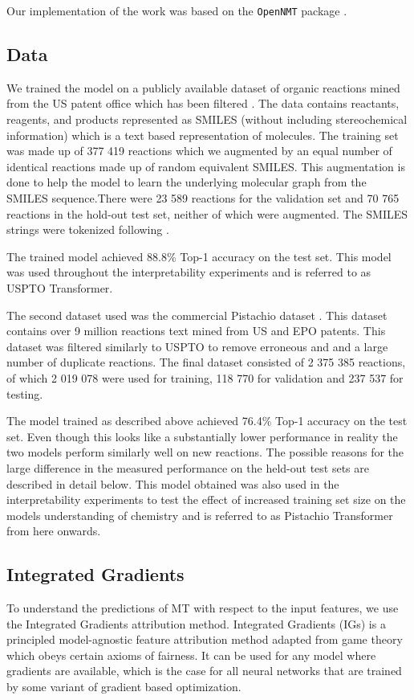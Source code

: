 Our implementation of the work was based on the \texttt{OpenNMT} package \cite{Klein2017}.

\subsection{Data}
We trained the model on a publicly available dataset of organic reactions mined from the US patent office \cite{Lowe2012} which has been filtered \cite{Jin2017}. The data contains reactants, reagents, and products represented as SMILES (without including stereochemical information) which is a text based representation of molecules\cite{Weininger1988, Weininger1989}. The training set was made up of 377 419 reactions which we augmented by an equal number of identical reactions made up of random equivalent SMILES. This augmentation is done to help the model to learn the underlying molecular graph from the SMILES sequence.There were 23 589 reactions for the validation set and 70 765 reactions in the hold-out test set, neither of which were augmented. The SMILES strings were tokenized following \cite{Schwaller2019MolecularPrediction}.

The trained model achieved 88.8\% Top-1 accuracy on the test set. This model was used throughout the interpretability experiments and is referred to as USPTO Transformer.

The second dataset used was the commercial Pistachio dataset \cite{Mayfield2018Pistachio2.0}. This dataset contains over 9 million reactions text mined from US and EPO patents. This dataset was filtered similarly to USPTO to remove erroneous and and a large number of duplicate reactions. The final dataset consisted of 2 375 385 reactions, of which 2 019 078 were used for training, 118 770 for validation and 237 537 for testing. 

The model trained as described above achieved 76.4\% Top-1 accuracy on the test set. Even though this looks like a substantially lower performance in reality the two models perform similarly well on new reactions. The possible reasons for the large difference in the measured performance on the held-out test sets are described in detail below. This model obtained was also used in the interpretability experiments to test the effect of increased training set size on the models understanding of chemistry and is referred to as Pistachio Transformer from here onwards. 

\subsection{Integrated Gradients}
To understand the predictions of MT with respect to the input features, we use the Integrated Gradients \cite{Sundararajan2017AxiomaticNetworks} attribution method. Integrated Gradients (IGs) is a principled model-agnostic feature attribution method adapted from game theory which obeys certain axioms of fairness. It can be used for any model where gradients are available, which is the case for all neural networks that are trained by some variant of gradient based optimization.

